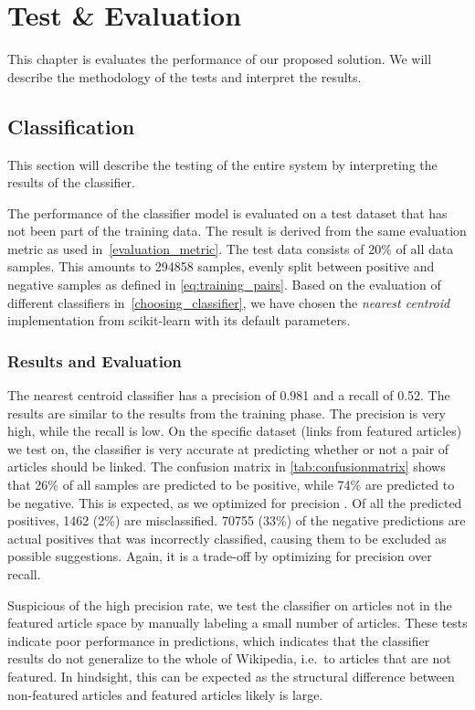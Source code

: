 \chapter{Test \& Evaluation}\label{chap:testeval}
This chapter is evaluates the performance of our proposed solution. We will describe the methodology of the tests and interpret the results.

\section{Classification}
This section will describe the testing of the entire system by interpreting the results of the classifier.

The performance of the classifier model is evaluated on a test dataset that has not been part of the training data. The result is derived from the same evaluation metric as used in~\cref{evaluation_metric}. The test data consists of 20\% of all data samples. This amounts to \num{294858} samples, evenly split between positive and negative samples as defined in \cref{eq:training_pairs}. Based on the evaluation of different classifiers in~\cref{choosing_classifier}, we have chosen the \emph{nearest centroid} implementation from scikit-learn with its default parameters.

\subsection{Results and Evaluation}
The nearest centroid classifier has a precision of \num{0.981} and a recall of \num{0.52}. The results are similar to the results from the training phase. The precision is very high, while the recall is low. On the specific dataset (links from featured articles) we test on, the classifier is very accurate at predicting whether or not a pair of articles should be linked. The confusion matrix in \cref{tab:confusionmatrix} shows that 26\% of all samples are predicted to be positive, while 74\% are predicted to be negative. This is expected, as we optimized for precision . Of all the predicted positives, \num{1462} (2\%) are misclassified. \num{70755} (33\%) of the negative predictions are actual positives that was incorrectly classified, causing them to be excluded as possible suggestions. Again, it is a trade-off by optimizing for precision over recall. 

Suspicious of the high precision rate, we test the classifier on articles not in the featured article space by manually labeling a small number of articles. These tests indicate poor performance in predictions, which indicates that the classifier results do not generalize to the whole of Wikipedia, i.e.\ to articles that are not featured. In hindsight, this can be expected as the structural difference between non-featured articles and featured articles likely is large.

